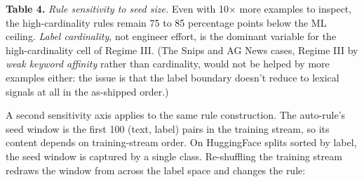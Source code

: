\textbf{Table 4.} \emph{Rule sensitivity to seed size.} Even with 10×
more examples to inspect, the high-cardinality rules remain 75 to 85
percentage points below the ML ceiling. \emph{Label cardinality}, not
engineer effort, is the dominant variable for the high-cardinality cell
of Regime III. (The Snips and AG News cases, Regime III by \emph{weak
keyword affinity} rather than cardinality, would not be helped by more
examples either: the issue is that the label boundary doesn't reduce to
lexical signals at all in the as-shipped order.)

A second sensitivity axis applies to the same rule construction. The
auto-rule's seed window is the first 100 (text, label) pairs in the
training stream, so its content depends on training-stream order. On
HuggingFace splits sorted by label, the seed window is captured by a
single class. Re-shuffling the training stream redraws the window from
across the label space and changes the rule:

